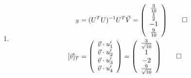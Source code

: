 \documentclass[12pt, a4paper]{article}
\begin{document}
\begin{enumerate}[Q\arabic*.]
\begin{enumerate}[(\alph*)]
      \item 
        \begin{align*}
          [\vec{v}]_S &= (U^TU)^{-1}U^T \vec{V}
                      = \left(\begin{array}{c} \frac{3}{10}\\ \frac{1}{2}\\ -1\\ \frac{9}{10} \end{array}\right) \qed\\
          [\vec{v}]_T &= \left(\begin{array}{c} \vec{v}\cdot u_1'\\ \vec{v}\cdot u_2'\\ \vec{v}\cdot u_3'\\ \vec{v}\cdot u_4'\end{array}\right) = \left(\begin{array}{c} \frac{3}{\sqrt{10}}\\ 1\\ -2\\ \frac{9}{\sqrt{10}} \end{array}\right) \qed
        \end{align*}
    \end{enumerate}
\end{enumerate}
\end{document}

